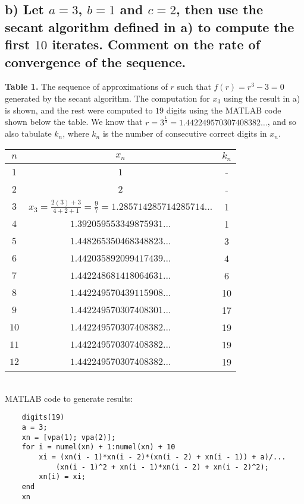 \documentclass[11pt, letterpaper]{article}
\begin{document}
\subsection*{b) \normalfont Let $a=3$, $b=1$ and $c=2$, then use the secant algorithm defined in a)
to compute the first $10$ iterates. Comment on the rate of convergence of the sequence.}
{\bf Table 1.}
The sequence of approximations of $r$ such that $f(r)=r^3-3=0$ generated by the secant algorithm.
The computation for $x_3$ using the result in a) is shown, and the rest were computed to $19$ digits using the
MATLAB code shown below the table. We know that $r=3^{\frac{1}{3}}=1.442249570307408382\dots$, and so also tabulate $k_n$,
where $k_n$ is the number of consecutive correct digits in $x_n$.
\begin{table}[h!]
    \begin{center}
        \begin{tabular}{c|c|c}
            $n$ & $x_n$ & $k_n$\\
            \hline
            $1$ & $1$ & -\\
            $2$ & $2$ & -\\
            $3$ & $x_3=\frac{2(3)+3}{4+2+1}=\frac{9}{7}=1.285714285714285714\dots$ & 1\\
            $4$ & $1.392059553349875931\dots$ & 1\\
            $5$ & $1.448265350468348823\dots$ & 3\\
            $6$ & $1.442035892099417439\dots$ & 4\\
            $7$ & $1.442248681418064631\dots$ & 6\\
            $8$ & $1.442249570439115908\dots$ & 10\\
            $9$ & $1.442249570307408301\dots$ & 17\\
            $10$ & $1.442249570307408382\dots$ & 19\\
            $11$ & $1.442249570307408382\dots$ & 19\\
            $12$ & $1.442249570307408382\dots$ & 19
        \end{tabular}
    \end{center}
\end{table}\\
MATLAB code to generate results:
\begin{verbatim}
    digits(19)
    a = 3;
    xn = [vpa(1); vpa(2)];
    for i = numel(xn) + 1:numel(xn) + 10
        xi = (xn(i - 1)*xn(i - 2)*(xn(i - 2) + xn(i - 1)) + a)/...
            (xn(i - 1)^2 + xn(i - 1)*xn(i - 2) + xn(i - 2)^2);
        xn(i) = xi;
    end
    xn
\end{verbatim}
\end{document}
